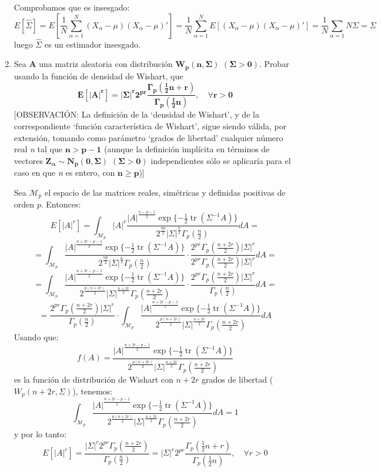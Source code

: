 \documentclass[11pt,a4paper]{article}
\begin{document}
\begin{enumerate}[label=\arabic*.]
Comprobamos que es insesgado:
$$E[\hat{\Sigma}] = E[\frac{1}{N} \sum_{\alpha=1}^{N} (X_{\alpha}-\mu)(X_{\alpha}-\mu)'] = \frac{1}{N} \sum_{\alpha=1}^{N} E[(X_{\alpha}-\mu)(X_{\alpha}-\mu)'] = \frac{1}{N} \sum_{\alpha=1}{N} \Sigma = \Sigma$$
luego $\hat{\Sigma}$ es un estimador insesgado.

\newpage
\bfseries
\item Sea $\mathbf{A}$ una matriz aleatoria con distribución $\mathbf{W_{p}(n, \Sigma)}$ $\mathbf{(\Sigma > 0)}$. Probar usando la función de densidad de Wishart, que
$$\mathbf{E[|A|^{r}] = |\Sigma|^{r} 2^{pr} \frac{\Gamma_{p}(\frac{1}{2}n+r)}{\Gamma_{p}(\frac{1}{2}n)}, \quad \forall r > 0}$$
[OBSERVACIÓN: La definición de la `densidad de Wishart', y de la correspondiente `función característica de Wishart', sigue siendo válida, por extensión, tomando como parámetro `grados de libertad' cualquier número real \emph{n} tal que $\mathbf{n > p-1}$ (aunque la definición implícita en términos de vectores $\mathbf{Z_{\alpha} \sim N_{p}(0, \Sigma)}$ $\mathbf{(\Sigma > 0)}$ independientes sólo se aplicaría para el caso en que \emph{n} es entero, con $\mathbf{n \geq p}$)]

\vspace{0.5cm}
\normalfont

Sea $\mathcal{M}_{p}$ el espacio de las matrices reales, simétricas y definidas positivas de orden $p$. Entonces:
$$E[|A|^{r}] = \int_{\mathcal{M}_{p}} |A|^{r} \frac{|A|^{\frac{n-p-1}{2}} \exp\{-\frac{1}{2} \operatorname{tr}(\Sigma^{-1}A)\}}{2^{\frac{np}{2}}|\Sigma|^{\frac{n}{2}}\Gamma_{p}(\frac{n}{2})} dA =$$
$$= \int_{\mathcal{M}_{p}} \frac{|A|^{\frac{n+2r-p-1}{2}} \exp\{-\frac{1}{2} \operatorname{tr}(\Sigma^{-1}A)\}}{2^{\frac{np}{2}}|\Sigma|^{\frac{n}{2}}\Gamma_{p}(\frac{n}{2})} \cdot \frac{2^{pr} \Gamma_{p}(\frac{n+2r}{2})|\Sigma|^{r}}{2^{pr}\Gamma_{p}(\frac{n+2r}{2})|\Sigma|^{r}} dA =$$
$$= \int_{\mathcal{M}_{p}} \frac{|A|^{\frac{n+2r-p-1}{2}} \exp\{-\frac{1}{2} \operatorname{tr}(\Sigma^{-1}A)\}}{2^{\frac{p(n+2r)}{2}}|\Sigma|^{\frac{n+2r}{2}}\Gamma_{p}(\frac{n+2r}{2})} \cdot \frac{2^{pr} \Gamma_{p}(\frac{n+2r}{2})|\Sigma|^{r}}{\Gamma_{p}(\frac{n}{2})} dA =$$
$$= \frac{2^{pr}\Gamma_{p}(\frac{n+2r}{2})|\Sigma|^{r}}{\Gamma_{p}(\frac{n}{2})} \cdot \int_{\mathcal{M}_{p}} \frac{|A|^{\frac{n+2r-p-1}{1}} \exp\{-\frac{1}{2} \operatorname{tr}(\Sigma^{-1}A)\}}{2^{\frac{p(n+2r)}{2}} |\Sigma|^{\frac{n+2r}{2}} \Gamma_{p}(\frac{n+2r}{2})} dA$$
Usando que:
$$f(A) = \frac{|A|^{\frac{n+2r-p-1}{2}} \exp\{-\frac{1}{2} \operatorname{tr}(\Sigma^{-1}A)\}}{2^{\frac{p(n+2r)}{2}}|\Sigma|^{\frac{n+2r}{2}}\Gamma_{p}(\frac{n+2r}{2})}$$
es la función de distribución de Wishart con $n+2r$ grados de libertad ($W_{p}(n+2r, \Sigma)$), tenemos:
$$\int_{\mathcal{M}_{p}} \frac{|A|^{\frac{n+2r-p-1}{1}} \exp\{-\frac{1}{2} \operatorname{tr}(\Sigma^{-1}A)\}}{2^{\frac{p(n+2r)}{2}} |\Sigma|^{\frac{n+2r}{2}} \Gamma_{p}(\frac{n+2r}{2})} dA = 1$$
y por lo tanto:
$$E[|A|^{r}] = \frac{|\Sigma|^{r}2^{pr}\Gamma_{p}(\frac{n+2r}{2})}{\Gamma_{p}(\frac{n}{2})} = |\Sigma|^{r} 2^{pr} \frac{\Gamma_{p}(\frac{1}{2}n+r)}{\Gamma_{p}(\frac{1}{2}n)}, \quad \forall r > 0$$


\end{enumerate}
\end{document}
